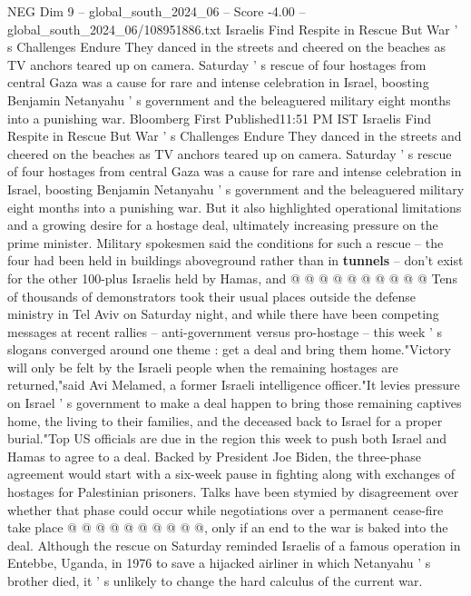 \begin{textsample}{NEG Dim 9 – global\_south\_2024\_06 – Score -4.00 – global\_south\_2024\_06/108951886.txt}  \label{ex:f9_neg_360}
Israelis Find Respite in Rescue But War ' s Challenges Endure They danced in the streets and cheered on the beaches as TV anchors teared up on camera.
Saturday ' s rescue of four hostages from central Gaza was a cause for rare and intense celebration in Israel, boosting Benjamin Netanyahu ' s government and the beleaguered military eight months into a punishing war.
Bloomberg First Published11:51 PM IST Israelis Find Respite in Rescue But War ' s Challenges Endure They danced in the streets and cheered on the beaches as TV anchors teared up on camera.
Saturday ' s rescue of four hostages from central Gaza was a cause for rare and intense celebration in Israel, boosting Benjamin Netanyahu ' s government and the beleaguered military eight months into a punishing war.
But it also highlighted operational limitations and a growing desire for a hostage deal, ultimately increasing pressure on the prime minister.
Military spokesmen said the conditions for such a rescue -- the four had been held in buildings aboveground rather than in \textbf{tunnels} -- don't exist for the other 100-plus Israelis held by Hamas, and @ @ @ @ @ @ @ @ @ @ Tens of thousands of demonstrators took their usual places outside the defense ministry in Tel Aviv on Saturday night, and while there have been competing messages at recent rallies -- anti-government versus pro-hostage -- this week ' s slogans converged around one theme : get a deal and bring them home."Victory will only be felt by the Israeli people when the remaining hostages are returned,"said Avi Melamed, a former Israeli intelligence officer."It levies pressure on Israel ' s government to make a deal happen to bring those remaining captives home, the living to their families, and the deceased back to Israel for a proper burial."Top US officials are due in the region this week to push both Israel and Hamas to agree to a deal.
Backed by President Joe Biden, the three-phase agreement would start with a six-week pause in fighting along with exchanges of hostages for Palestinian prisoners.
Talks have been stymied by disagreement over whether that phase could occur while negotiations over a permanent cease-fire take place @ @ @ @ @ @ @ @ @ @, only if an end to the war is baked into the deal.
Although the rescue on Saturday reminded Israelis of a famous operation in Entebbe, Uganda, in 1976 to save a hijacked airliner in which Netanyahu ' s brother died, it ' s unlikely to change the hard calculus of the current war.

\end{textsample}
